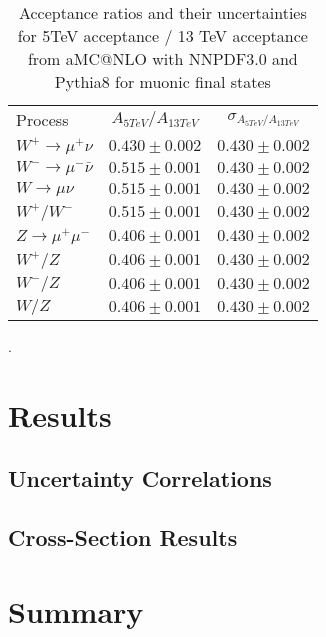 \documentclass[aps,prd,final,twocolumn,letterpaper]{revtex4}
\begin{document}
			\begin{table}
				\centering
				\begin{tabular}{l c c}
					Process 								& $A_{5TeV}/A_{13TeV}$ 		&$\sigma_{A_{5TeV}/A_{13TeV}}$	\\
					$W^{+}\rightarrow \mu^{+}\nu$ 			& $0.430 \pm 0.002$ 		& $0.430 \pm 0.002$ \\
					$W^{-}\rightarrow \mu^{-}\bar{\nu}$ 	& $0.515\pm 0.001$ 			& $0.430 \pm 0.002$ \\		
					$W\rightarrow \mu\nu$ 					& $0.515\pm 0.001$ 			& $0.430 \pm 0.002$ \\
					$W^{+}/W^{-}$					 		& $0.515\pm 0.001$ 			& $0.430 \pm 0.002$ \\
					$Z\rightarrow \mu^{+}\mu^{-}$ 			& $0.406\pm 0.001$ 			& $0.430 \pm 0.002$ \\
					$W^{+}/Z$				 				& $0.406\pm 0.001$ 			& $0.430 \pm 0.002$ \\
					$W^{-}/Z$				 				& $0.406\pm 0.001$ 			& $0.430 \pm 0.002$ \\
					$W/Z$				 					& $0.406\pm 0.001$ 			& $0.430 \pm 0.002$ \\					
				\end{tabular}
				\caption{Acceptance ratios and their uncertainties for 5TeV acceptance / 13 TeV acceptance from aMC@NLO with NNPDF3.0 and Pythia8 for muonic final states}.
				\label{tab:pdf_ratios_muons}
			\end{table}			
	
		
	\section{Results}
		\subsection{Uncertainty Correlations}
		\subsection{Cross-Section Results}
	\section{Summary}

	
	
\end{document}
